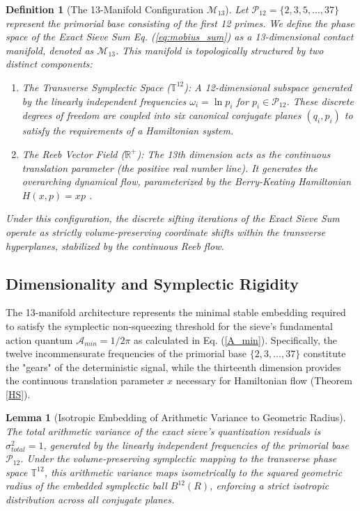 \documentclass[sn-mathphys-num, pdflatex]{sn-jnl}
\newtheorem{definition}[theorem]{Definition}
\newtheorem{lemma}{Lemma}
\begin{document}
\begin{definition}[The 13-Manifold Configuration $\mathcal{M}_{13}$] \label{def4.1}
Let $\mathcal{P}_{12} = \{2, 3, 5, \dots, 37\}$ represent the primorial base consisting of the first 12 primes\label{P}. We define the phase space of the Exact Sieve Sum Eq. (\ref{eq:mobius_sum}) as a 13-dimensional contact manifold, denoted as $\mathcal{M}_{13}$. This manifold is topologically structured by two distinct components:
\begin{enumerate}
    \item \textit{The Transverse Symplectic Space ($\mathbb{T}^{12}$):} A 12-dimensional subspace generated by the linearly independent frequencies $\omega_i = \ln p_i$ for $p_i \in \mathcal{P}_{12}$. These discrete degrees of freedom are coupled into six canonical conjugate planes $(q_i, p_i)$ to satisfy the requirements of a Hamiltonian system.
    \item \textit{The Reeb Vector Field \label{Reeb} ($\mathbb{R}^+$):} The 13th dimension acts as the continuous translation parameter (the positive real number line). It generates the overarching dynamical flow, parameterized by the Berry-Keating Hamiltonian $H(x,p) = xp$ \cite{berry1999riemann}.
\end{enumerate}
Under this configuration, the discrete sifting iterations of the Exact Sieve Sum operate as strictly volume-preserving coordinate shifts within the transverse hyperplanes, stabilized by the continuous Reeb flow.
\end{definition} 

\subsection{Dimensionality and Symplectic Rigidity}
The 13-manifold architecture represents the minimal stable embedding required to satisfy the symplectic non-squeezing threshold for the sieve's fundamental action quantum $\mathcal{A}_{min} = 1/2\pi$ as calculated in Eq. (\ref{A_min}). Specifically, the twelve incommensurate frequencies of the primorial base $\{2, 3, \dots, 37\}$ constitute the "gears" of the deterministic signal, while the thirteenth dimension provides the continuous translation parameter $x$ necessary for Hamiltonian flow (Theorem \ref{HS}). 

\begin{lemma}[Isotropic Embedding of Arithmetic Variance to Geometric Radius]
\label{lemma:variance_radius_isomorphism}
The total arithmetic variance of the exact sieve's quantization residuals is $\sigma_{total}^2 = 1$, generated by the linearly independent frequencies of the primorial base $\mathcal{P}_{12}$. Under the volume-preserving symplectic mapping to the transverse phase space $\mathbb{T}^{12}$, this arithmetic variance maps isometrically to the squared geometric radius of the embedded symplectic ball $B^{12}(R)$, enforcing a strict isotropic distribution across all conjugate planes.
\end{lemma}
\end{document}
